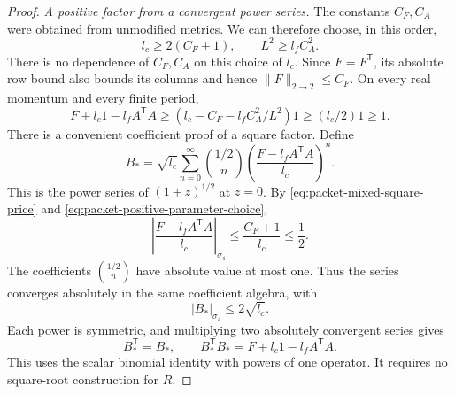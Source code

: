 \documentclass[11pt,reqno]{amsart}
\numberwithin{equation}{section}
\theoremstyle{definition}
\theoremstyle{remark}
\begin{document}
\begin{proof}
\smallskip\noindent
\emph{A positive factor from a convergent power series.}
The constants \(C_F,C_A\) were obtained from unmodified
metrics. We can therefore choose, in this order,
\begin{equation}
                 l_c\ge2(C_F+1),\qquad
                             L^2\ge l_fC_A^2.
 \label{eq:packet-positive-parameter-choice}
\end{equation}
There is no dependence of \(C_F,C_A\) on this choice of
\(l_c\). Since \(F=F^{\mathsf T}\), its absolute row bound also
bounds its columns and hence \(\|F\|_{2\to2}\le C_F\).
On every real momentum and every finite period,
\[
 F+l_c1-l_fA^{\mathsf T}A
 \ge(l_c-C_F-l_fC_A^2/L^2)1
 \ge(l_c/2)1\ge1.
\]
There is a convenient coefficient proof of a square factor.
Define
\begin{equation}
 B_*=\sqrt{l_c}\sum_{n=0}^{\infty}\binom{1/2}{n}
                \left(\frac{F-l_fA^{\mathsf T}A}{l_c}\right)^n.
 \label{eq:packet-binomial-factor}
\end{equation}
This is the power series of \((1+z)^{1/2}\) at \(z=0\).
By \eqref{eq:packet-mixed-square-price} and
\eqref{eq:packet-positive-parameter-choice},
\[
 \left|\frac{F-l_fA^{\mathsf T}A}{l_c}\right|_{\sigma_4}
       \le\frac{C_F+1}{l_c}\le\frac12.
\]
The coefficients \(\binom{1/2}{n}\) have absolute value at
most one. Thus the series converges absolutely in the same
coefficient algebra, with
\[
                          |B_*|_{\sigma_4}\le2\sqrt{l_c}.
\]
Each power is symmetric, and multiplying two absolutely
convergent series gives
\begin{equation}
            B_*^{\mathsf T}=B_*,\qquad B_*^{\mathsf T}B_*=F+l_c1-l_fA^{\mathsf T}A.
 \label{eq:packet-binomial-square}
\end{equation}
This uses the scalar binomial identity with powers of one
operator. It requires no square-root construction for \(R\).


\end{proof}
\end{document}
